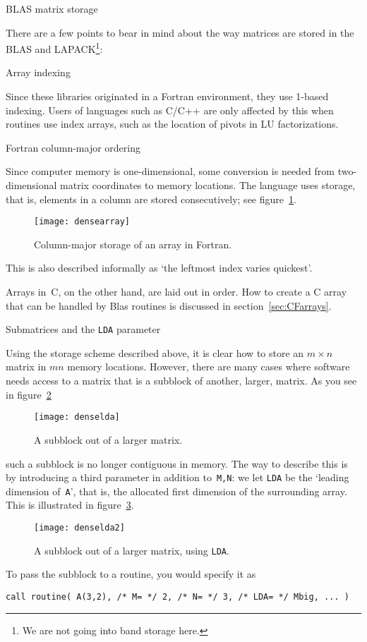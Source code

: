  {BLAS matrix storage}
\label{tut:blas-storage}

There are a few points to bear in mind about the way matrices are
stored in the BLAS and LAPACK\footnote{We are not going into band
  storage here.}:

 {Array indexing}

Since these libraries originated in a Fortran environment, they
  use 1-based indexing. Users of languages such as C/C++ are only
  affected by this when routines use index arrays, such as the
  location of pivots in LU factorizations.

 {Fortran column-major ordering}

Since computer memory is one-dimensional, some conversion is needed
from two-dimensional matrix coordinates to memory locations. The
 language uses  storage, that is,
elements in a column are stored consecutively; see
figure~\ref{fig:densearray}.
\begin{figure}
  \texttt{[image: densearray]}
  \caption{Column-major storage of an array in Fortran.}
  \label{fig:densearray}
\end{figure}
This is also described informally as `the leftmost index varies
quickest'.

Arrays in~C, on the other hand, are laid out in  order.
How to create a C array that can be handled by Blas routines
is discussed in section~\ref{sec:CFarrays}.

 {Submatrices and the {\tt LDA} parameter}

Using the storage scheme described above, it is clear how to store an
$m\times n$ matrix in $mn$ memory locations. However, there are many
cases where software needs access to a matrix that is a subblock of
another, larger, matrix. As you see in figure~\ref{fig:lda1}
\begin{figure}[ht]
  \texttt{[image: denselda]}
  \caption{A subblock out of a larger matrix.}
  \label{fig:lda1}
\end{figure}
such a subblock is no longer contiguous in memory. The way to describe
this is by introducing a third parameter in addition to~{\tt M,N}: we
let {\tt LDA} be the `leading dimension of~{\tt A}', that is, the
allocated first dimension of the surrounding array. This is
illustrated in figure~\ref{fig:lda2}.
\begin{figure}
  \texttt{[image: denselda2]}
  \caption{A subblock out of a larger matrix, using {\tt LDA}.}
  \label{fig:lda2}
\end{figure}
To pass the subblock to a routine, you would specify it as
\begin{verbatim}
call routine( A(3,2), /* M= */ 2, /* N= */ 3, /* LDA= */ Mbig, ... )
\end{verbatim}

